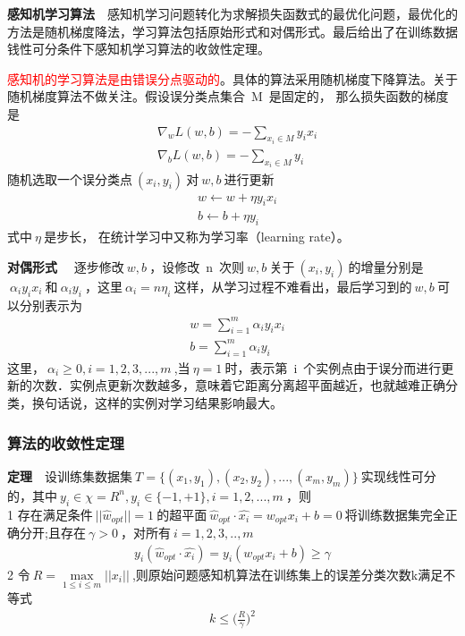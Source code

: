 \textbf{感知机学习算法}~~感知机学习问题转化为求解损失函数式的最优化问题，最优化的方法是随机梯度降法，学习算法包括原始形式和对偶形式。最后给出了在训练数据钱性可分条件下感知机学习算法的收敛性定理。

\textcolor{red}{感知机的学习算法是由错误分点驱动的}。具体的算法采用随机梯度下降算法。关于随机梯度算法不做关注。假设误分类点集合~M~是固定的， 那么损失函数的梯度是
\begin{align}
&\nabla_wL(w,b)=-\sum_{x_i \in M}y_ix_i  \nonumber\\
&\nabla_bL(w,b)=-\sum_{x_i \in M}y_i     \nonumber
\end{align}
随机选取一个误分类点$~(x_i,y_i)~$对$~w,b~$进行更新
\begin{align}
&w\leftarrow    w+\eta y_ix_i  \nonumber\\
&b\leftarrow    b+\eta y_i     \nonumber
\end{align}
式中$~\eta~$是步长， 在统计学习中又称为学习率（learning rate）。

\textbf{对偶形式}~~
逐步修改$~w,b~$，设修改~n~次则$~w,b~$关于$~(x_i,y_i)~$的增量分别是$~\alpha_iy_ix_i~$和$~\alpha_iy_i~$，这里$~\alpha_i=n\eta_i~$这样，从学习过程不难看出，最后学习到的$~w,b~$可以分别表示为
\begin{align}
&w = \sum_{i=1}^{m}\alpha_iy_ix_i  \nonumber\\
&b = \sum_{i=1}^{m}\alpha_iy_i     \nonumber
\end{align}
这里，$~\alpha_i\geq 0,i=1,2,3,...,m~$,当$~\eta=1~$时，表示第~i~个实例点由于误分而进行更新的次数．实例点更新次数越多，意味着它距离分离超平面越近，也就越难正确分类，换句话说，这样的实例对学习结果影响最大。


\subsubsection{算法的收敛性定理}
\textbf{定理}~~设训练集数据集$~T=\{(x_1,y_1),(x_2,y_2),...,(x_m,y_m)\}~$实现线性可分的，其中$~y_i \in \chi=R^n ,y_i \in \{-1,+1\},i=1,2,...,m ~$，则\\
\indent \textcircled{\footnotesize{1}} 存在满足条件$~||\hat{w}_{opt}||=1~$的超平面$~\hat{w}_{opt}\cdot \hat{x_i} = w_{opt}x_i+b=0~$将训练数据集完全正确分开;且存在$~\gamma>0~$，对所有$~i=1,2,3,..,m~$
\begin{align}
  y_i(\hat{w}_{opt}\cdot \hat{x_i}) = y_i(w_{opt}x_i+b)\geq \gamma \nonumber
\end{align}
\indent \textcircled{\footnotesize{2}} 令$~R=\max \limits_{1\leq i\leq m}||x_i||~$,则原始问题感知机算法在训练集上的误差分类次数k满足不等式
\begin{align}
  k\leq \Big(\frac{R}{\gamma}\Big)^2 \nonumber
\end{align}

